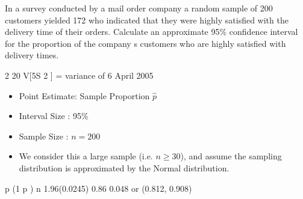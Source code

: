 \documentclass[a4paper,12pt]{article}
\begin{document}
In a survey conducted by a mail order company a random sample of 200 customers yielded 172 who indicated that they were highly satisfied with the delivery time of their orders.
Calculate an approximate 95\% confidence interval for the proportion of the
company s customers who are highly satisfied with delivery times.

2
20
V[5S 2 ] = variance of
6
April 2005


\begin{itemize}
\item Point Estimate: Sample Proportion $\hat{p}$
\item Interval Size : 95\%
\item Sample Size : $n=200$
\item We consider this a large sample (i.e. $n \geq 30$), and assume the sampling distribution is approximated by the Normal distribution.
\end{itemize}


p (1 p )
n
1.96(0.0245)
0.86
0.048 or (0.812, 0.908)
\end{document}
